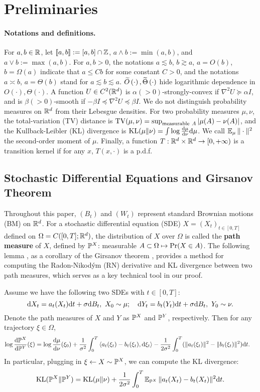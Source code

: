\section{Preliminaries}
\label{sec:pre}
\paragraph{Notations and definitions.}
For $a,b\in\R$, let $\sqd{a,b}:=[a,b]\cap\Z$, $a\wedge b:=\min(a,b)$, and $a\vee b:=\max(a,b)$.
For $a,b>0$, the notations $a\lesssim b$, $b\gtrsim a$, $a=O(b)$, $b=\Omega(a)$ indicate that $a\le Cb$ for some constant $C>0$, and the notations $a\asymp b$, $a=\Theta(b)$ stand for $a\lesssim b\lesssim a$. $\Ot\ro{\cdot},\Thetat\ro{\cdot}$ hide logarithmic dependence in $O(\cdot),\Theta(\cdot)$.
A function $U\in C^2(\R^d)$ is $\alpha(>0)$-strongly-convex if $\nabla^2U\succeq\alpha I$, and is $\beta(>0)$-smooth if $-\beta I\preceq\nabla^2U\preceq\beta I$.
We do not distinguish probability measures on $\R^d$ from their Lebesgue densities.
For two probability measures $\mu,\nu$, the total-variation (TV) distance is $\tv(\mu,\nu)=\sup_{\textrm{measurable}~A}|\mu(A)-\nu(A)|$, and the Kullback-Leibler (KL) divergence is $\kl(\mu\|\nu)=\int\log\de{\mu}{\nu}\d\mu$.
We call $\E_\mu\|\cdot\|^2$ the second-order moment of $\mu$.
Finally, a function $T:\R^d\times\R^d\to[0,\pif)$ is a transition kernel if for any $x$, $T(x,\cdot)$ is a p.d.f.

\subsection{Stochastic Differential Equations and Girsanov Theorem}
Throughout this paper, $(B_t)$ and $(W_t)$ represent standard Brownian motions (BM) on $\R^d$. For a stochastic differential equation (SDE) $X=(X_t)_{t\in[0,T]}$ defined on $\Omega=C([0,T];\R^d)$, the distribution of $X$ over $\Omega$ is called the \textbf{path measure} of $X$, defined by $\P^X$: measurable $A\subset\Omega\mapsto\prob(X\in A)$. 
The following lemma
, as a corollary of the Girsanov theorem \cite[Prop. 2.3.1 \& Cor. 2.3.1]{ustunel2013transformation},
provides a method for computing the Radon-Nikod\'ym (RN) derivative and KL divergence between two path measures, which serves as a key technical tool in our proof.


\begin{lemma}
    \label{lem:rn_path_measure}
    Assume we have the following two SDEs with $t\in[0,T]$:
    $$\d X_t=a_t(X_t)\d t+\sigma\d B_t,~X_0\sim\mu;\quad\d Y_t =b_t(Y_t)\d t+\sigma\d B_t,~Y_0\sim\nu.$$
    Denote the path measures of $X$ and $Y$ as $\P^X$ and $\P^Y$, respectively. Then for any trajectory $\xi\in\Omega$, 
    \begin{align*}
        \log\de{\P^X}{\P^Y}(\xi) & =\log\de{\mu}{\nu}(\xi_0)+\frac{1}{\sigma^2}\int_0^T\inn{a_t(\xi_t)-b_t(\xi_t),\d\xi_t}-\frac{1}{2\sigma^2}\int_0^T(\|a_t(\xi_t)\|^2-\|b_t(\xi_t)\|^2)\d t.
    \end{align*}
    In particular, plugging in $\xi\gets X\sim\P^X$, we can compute the KL divergence:
    $$\kl(\P^X\|\P^Y)=\kl(\mu\|\nu)+\frac{1}{2\sigma^2}\int_0^T\E_{\P^X}\|a_t(X_t)-b_t(X_t)\|^2\d t.$$
\end{lemma}


